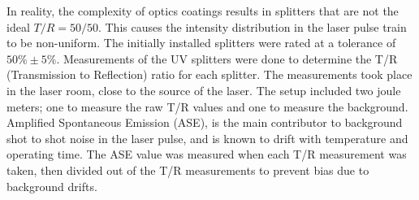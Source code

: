In reality, the complexity of optics coatings results in splitters that are not 
the ideal $T/R = 50/50$. This causes the intensity distribution in the 
laser pulse train to be non-uniform. 
The initially installed splitters were rated at a tolerance of $50\%\pm5\%$.
Measurements of the UV splitters were done to determine the T/R (Transmission to Reflection) ratio for 
each splitter. The measurements took place in the laser room, close to the source of the laser.
The setup included two joule meters; one to measure the raw T/R values and one to measure 
the background. Amplified Spontaneous Emission (ASE), 
is the main contributor to background shot to shot noise in the laser pulse,
and is known to drift with temperature and operating time. 
The ASE value was measured when each T/R measurement was taken, then divided out of the T/R 
measurements to prevent bias due to background drifts. 

